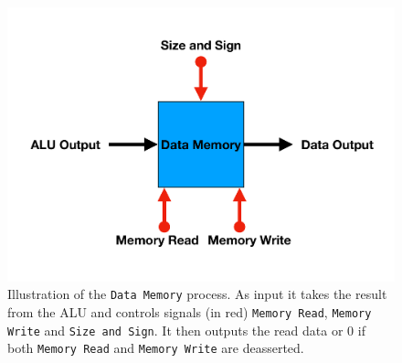         \begin{figure}[h!]
            \centering
            \includegraphics[scale=0.35]{pictures/DM.pdf}
            \caption{Illustration of the \texttt{Data Memory} process. As input it takes the result from the ALU and controls signals (in red) \texttt{Memory Read}, \texttt{Memory Write} and \texttt{Size and Sign}. It then outputs the read data or 0 if both \texttt{Memory Read} and \texttt{Memory Write} are deasserted.}
            \label{fig:DM}
        \end{figure}
    
